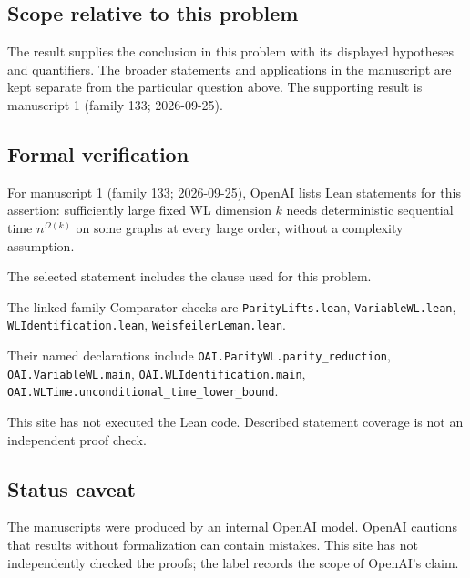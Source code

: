 \documentclass[11pt]{article}
\begin{document}
\subsection{Scope relative to this problem}
The result supplies the conclusion in this problem with its displayed hypotheses and quantifiers. The broader statements and applications in the manuscript are kept separate from the particular question above. The supporting result is manuscript 1 (family 133; 2026-09-25).

\subsection{Formal verification}
For manuscript 1 (family 133; 2026-09-25), OpenAI lists Lean statements for this assertion: sufficiently large fixed WL dimension $k$ needs deterministic sequential time $n^{\Omega(k)}$ on some graphs at every large order, without a complexity assumption.

The selected statement includes the clause used for this problem.

The linked family Comparator checks are \texttt{ParityLifts.lean}, \texttt{VariableWL.lean}, \texttt{WLIdentification.lean}, \texttt{WeisfeilerLeman.lean}.

Their named declarations include \texttt{OAI.ParityWL.parity\_reduction}, \texttt{OAI.VariableWL.main}, \texttt{OAI.WLIdentification.main}, \texttt{OAI.WLTime.unconditional\_time\_lower\_bound}.

This site has not executed the Lean code. Described statement coverage is not an independent proof check.

\subsection{Status caveat}
The manuscripts were produced by an internal OpenAI model. OpenAI cautions that results without formalization can contain mistakes. This site has not independently checked the proofs; the label records the scope of OpenAI's claim.
\end{document}
